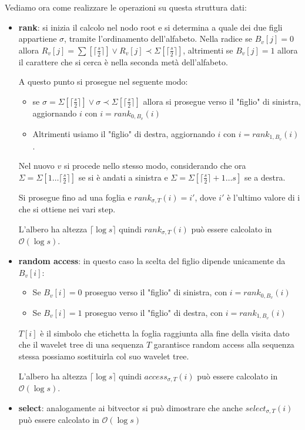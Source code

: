 Vediamo ora come realizzare le operazioni su questa struttura dati:
\begin{itemize}
    \item \textbf{rank}: si inizia il calcolo nel nodo root e si determina a quale dei due figli appartiene $\sigma$, tramite l'ordinamento dell'alfabeto. Nella radice se $B_v [j] = 0$ allora $R_v [j] = \sum [\lceil \frac{s}{2} \rceil] \lor R_v [j] \prec \Sigma[\lceil \frac{s}{2} \rceil]$, altrimenti se $B_v[j] = 1$ allora il carattere che si cerca è nella seconda metà dell'alfabeto. 

    A questo punto si prosegue nel seguente modo:
    \begin{itemize}
        \item se $\sigma = \Sigma [ \lceil \frac{s}{2} \rceil] \lor \sigma \prec \Sigma [\lceil \frac{s}{2}\rceil]$ allora si prosegue verso il "figlio" di sinistra, aggiornando $i$ con $i = rank_{0,B_v}(i)$
        \item Altrimenti usiamo il "figlio" di destra, aggiornando $i$ con $i = rank_{1,B_v}(i)$.
    \end{itemize}
    Nel nuovo $v$ si procede nello stesso modo, considerando che ora $\Sigma = \Sigma [1 \dots \lceil \frac{s}{2} \rceil]$ se si è andati a sinistra e $\Sigma = \Sigma [\lceil \frac{s}{2} \rceil + 1 \dots s]$ se a destra.
    
    Si prosegue fino ad una foglia e $rank_{\sigma,T} (i) = i'$, dove $i'$ è l'ultimo valore di i che si ottiene nei vari step.
    
    L'albero ha altezza $\lceil \log s\rceil$ quindi $rank_{\sigma,T} (i)$ può essere calcolato in $\mathcal{O}(\log s)$.

    \item \textbf{random access}: in questo caso la scelta del figlio dipende unicamente da $B_v [i]$:
    \begin{itemize}
        \item Se $B_v [i] = 0$ proseguo verso il "figlio" di sinistra, con $i = rank_{0,B_v}(i)$
        \item Se $B_v [i] = 1$ proseguo verso il "figlio" di destra, con $i = rank_{1,B_v}(i)$
    \end{itemize}
    
    $T[i]$ è il simbolo che etichetta la foglia raggiunta alla fine della visita dato che il wavelet tree di una sequenza $T$ garantisce random access alla sequenza stessa possiamo sostituirla col suo wavelet tree.

    L'albero ha altezza $\lceil\log s \rceil$ quindi $access_{\sigma,T} (i)$ può essere calcolato in $\mathcal{O}(\log s)$.

    \item \textbf{select}: analogamente ai bitvector si può dimostrare che anche $select_{\sigma,T}(i)$ può essere calcolato in $\mathcal{O}(\log s)$
\end{itemize}
